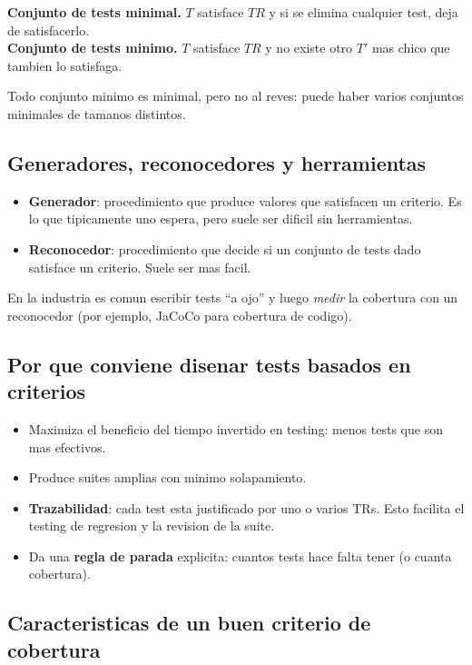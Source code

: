 \documentclass[12pt,a4paper]{article}
\begin{document}
\begin{definicionbox}
\textbf{Conjunto de tests minimal.} \(T\) satisface \(TR\) y si se elimina cualquier test, deja
de satisfacerlo. \\
\textbf{Conjunto de tests minimo.} \(T\) satisface \(TR\) y no existe otro \(T'\) mas chico que
tambien lo satisfaga.
\end{definicionbox}

Todo conjunto minimo es minimal, pero no al reves: puede haber varios conjuntos minimales de
tamanos distintos.

\subsection{Generadores, reconocedores y herramientas}

\begin{itemize}
  \item \textbf{Generador}: procedimiento que produce valores que satisfacen un criterio. Es lo
  que tipicamente uno espera, pero suele ser dificil sin herramientas.
  \item \textbf{Reconocedor}: procedimiento que decide si un conjunto de tests dado satisface un
  criterio. Suele ser mas facil.
\end{itemize}

En la industria es comun escribir tests ``a ojo'' y luego \emph{medir} la cobertura con un
reconocedor (por ejemplo, JaCoCo para cobertura de codigo).

\subsection{Por que conviene disenar tests basados en criterios}

\begin{itemize}
  \item Maximiza el beneficio del tiempo invertido en testing: menos tests que son mas efectivos.
  \item Produce suites amplias con minimo solapamiento.
  \item \textbf{Trazabilidad}: cada test esta justificado por uno o varios TRs. Esto facilita el
  testing de regresion y la revision de la suite.
  \item Da una \textbf{regla de parada} explicita: cuantos tests hace falta tener (o cuanta
  cobertura).
\end{itemize}

\subsection{Caracteristicas de un buen criterio de cobertura}
\end{document}
